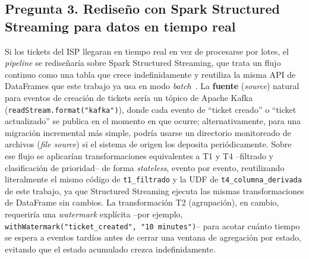 \documentclass[11pt,a4paper]{article}
\begin{document}
    \subsection*{Pregunta 3. Rediseño con Spark Structured Streaming para datos en tiempo real}

    Si los tickets del ISP llegaran en tiempo real en vez de procesarse por lotes, el
    \emph{pipeline} se rediseñaría sobre Spark Structured Streaming, que trata un flujo continuo
    como una tabla que crece indefinidamente y reutiliza la misma API de DataFrames que este
    trabajo ya usa en modo \emph{batch}~\autocite{armbrust2015}. La
    \textbf{fuente} (\emph{source}) natural para eventos de creación de tickets sería un tópico de
    Apache Kafka (\texttt{readStream.format("kafka")}), donde cada evento de \enquote{ticket
    creado} o \enquote{ticket actualizado} se publica en el momento en que ocurre; alternativamente,
    para una migración incremental más simple, podría usarse un directorio monitoreado de archivos
    (\emph{file source}) si el sistema de origen los deposita periódicamente. Sobre ese flujo se
    aplicarían transformaciones equivalentes a T1 y T4 --filtrado y clasificación de prioridad-- de
    forma \emph{stateless}, evento por evento, reutilizando literalmente el mismo código de
    \texttt{t1\_filtrado} y la UDF de \texttt{t4\_columna\_derivada} de este trabajo, ya que
    Structured Streaming ejecuta las mismas transformaciones de DataFrame sin cambios. La
    transformación T2 (agrupación), en cambio, requeriría una \emph{watermark} explícita --por
    ejemplo, \texttt{withWatermark("ticket\_created", "10 minutes")}-- para acotar cuánto tiempo se
    espera a eventos tardíos antes de cerrar una ventana de agregación por estado, evitando que el
    estado acumulado crezca indefinidamente.
\end{document}
